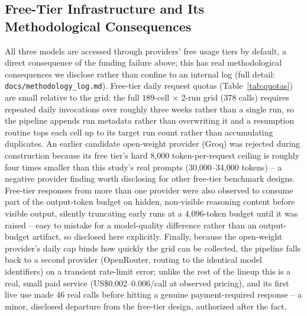 \documentclass[conference]{IEEEtran}
\begin{document}
\subsection{Free-Tier Infrastructure and Its Methodological Consequences}
All three models are accessed through providers' free usage tiers by
default, a direct consequence of the funding failure above; this has real
methodological consequences we disclose rather than confine to an internal
log (full detail: \texttt{docs/methodology\_log.md}). Free-tier daily
request quotas (Table~\ref{tab:quotas}) are small relative to the grid: the
full $189$-cell $\times$ 2-run grid ($378$ calls) requires repeated daily
invocations over roughly three weeks rather than a single run, so the
pipeline appends run metadata rather than overwriting it and a resumption
routine tops each cell up to its target run count rather than accumulating
duplicates. An earlier candidate open-weight provider (Groq) was rejected
during construction because its free tier's hard 8{,}000 token-per-request
ceiling is roughly four times smaller than this study's real prompts
(30{,}000--34{,}000 tokens) -- a negative provider finding worth disclosing
for other free-tier benchmark designs. Free-tier responses from more than
one provider were also observed to consume part of the output-token budget
on hidden, non-visible reasoning content before visible output, silently
truncating early runs at a 4{,}096-token budget until it was raised -- easy
to mistake for a model-quality difference rather than an output-budget
artifact, so disclosed here explicitly. Finally, because the open-weight
provider's daily cap binds how quickly the grid can be collected, the
pipeline falls back to a second provider (OpenRouter, routing to the
identical model identifiers) on a transient rate-limit error; unlike the
rest of the lineup this is a real, small paid service (US\$0.002--0.006/call
at observed pricing), and its first live use made 46 real calls before
hitting a genuine payment-required response -- a minor, disclosed
departure from the free-tier design, authorized after the fact.
\end{document}
